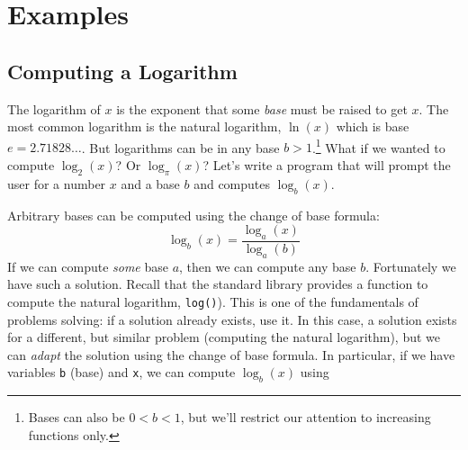 %
%
%
%

\section{Examples}

\subsection{Computing a Logarithm}

The logarithm of $x$ is the exponent that some \emph{base} must 
be raised to get $x$.  The most common logarithm is the natural logarithm, 
$\ln{(x)}$ which is base $e = 2.71828\ldots$.  But logarithms can be in any base 
$b > 1$.\footnote{Bases can also be $0< b < 1$, but we'll restrict our attention to
increasing functions only.}  What if we wanted to compute $\log_2{(x)}$?  
Or $\log_{\pi}{(x)}$?  Let's write a program that will prompt the user for a
number $x$ and a base $b$ and computes $\log_b{(x)}$.

Arbitrary bases can be computed using the change of base formula: 
  $$\log_b(x) = \frac{\log_a{(x)}}{\log_a{(b)}}$$
If we can compute \emph{some} base $a$, then we can compute any base 
$b$.  Fortunately we have such a solution.  Recall that the standard library 
provides a function to compute the natural logarithm, \texttt{log()}).
This is one of the fundamentals of problems solving: if a solution already 
exists, use it.  In this case, a solution exists for a different, but similar problem
(computing the natural logarithm), but we can \emph{adapt} the solution 
using the change of base formula.  In particular, if we have variables 
\texttt{b} (base) and \texttt{x}, we can compute $\log_b{(x)}$ using


